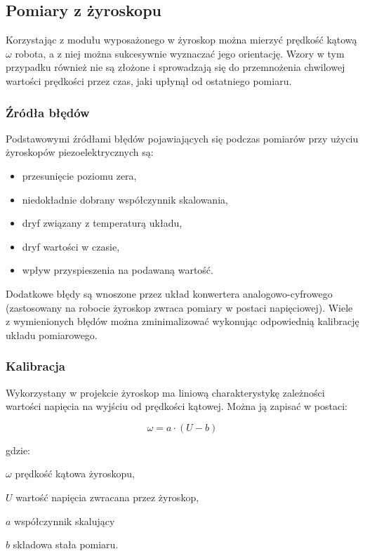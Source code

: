\subsection{Pomiary z żyroskopu}

Korzystając z modułu wyposażonego w żyroskop można mierzyć prędkość kątową
$\omega$ robota, a z niej można sukcesywnie wyznaczać jego orientację. Wzory w
tym przypadku również nie są złożone i sprowadzają się do przemnożenia chwilowej
wartości prędkości przez czas, jaki upłynął od ostatniego pomiaru.

\subsubsection{Źródła błędów}

Podstawowymi źródłami błędów pojawiających się podczas pomiarów przy użyciu
żyroskopów piezoelektrycznych są:

\begin{itemize}
  \item przesunięcie poziomu zera,
  \item niedokładnie dobrany współczynnik skalowania,
  \item dryf związany z temperaturą układu,
  \item dryf wartości w czasie,
  \item wpływ przyspieszenia na podawaną wartość.
\end{itemize}

Dodatkowe błędy są wnoszone przez układ konwertera analogowo-cyfrowego
(zastosowany na robocie żyroskop zwraca pomiary w postaci napięciowej).
Wiele z wymienionych błędów można zminimalizować wykonując odpowiednią
kalibrację układu pomiarowego.

\subsubsection{Kalibracja}

Wykorzystany w projekcie żyroskop ma liniową charakterystykę zależności
wartości napięcia na wyjściu od prędkości kątowej. Można ją zapisać w postaci:

\[
\omega = a \cdot (U - b)
\]

gdzie:

\begin{mydescription}{5pt}
\item[$\omega$] prędkość kątowa żyroskopu,
\item[$U$] wartość napięcia zwracana przez żyroskop,
\item[$a$] współczynnik skalujący
\item[$b$] składowa stała pomiaru.
\end{mydescription}

